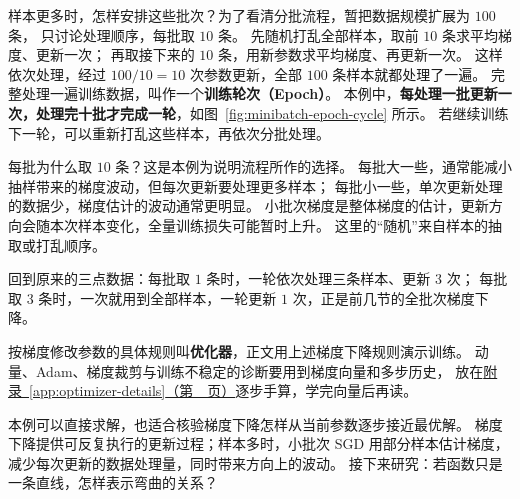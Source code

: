 样本更多时，怎样安排这些批次？为了看清分批流程，暂把数据规模扩展为 $100$ 条，
只讨论处理顺序，每批取 $10$ 条。
先随机打乱全部样本，取前 $10$ 条求平均梯度、更新一次；
再取接下来的 $10$ 条，用新参数求平均梯度、再更新一次。
这样依次处理，经过 $100/10=10$ 次参数更新，全部 $100$ 条样本就都处理了一遍。
\label{concept:epoch}
完整处理一遍训练数据，叫作一个\textbf{训练轮次（Epoch）}。
本例中，\textbf{每处理一批更新一次，处理完十批才完成一轮}，如图~\ref{fig:minibatch-epoch-cycle} 所示。
若继续训练下一轮，可以重新打乱这些样本，再依次分批处理。


每批为什么取 $10$ 条？这是本例为说明流程所作的选择。
每批大一些，通常能减小抽样带来的梯度波动，但每次更新要处理更多样本；
每批小一些，单次更新处理的数据少，梯度估计的波动通常更明显。
小批次梯度是整体梯度的估计，更新方向会随本次样本变化，全量训练损失可能暂时上升。
这里的“随机”来自样本的抽取或打乱顺序。

回到原来的三点数据：每批取 $1$ 条时，一轮依次处理三条样本、更新 $3$ 次；
每批取 $3$ 条时，一次就用到全部样本，一轮更新 $1$ 次，正是前几节的全批次梯度下降。

\label{concept:optimizer}
按梯度修改参数的具体规则叫\textbf{优化器}，正文用上述梯度下降规则演示训练。
动量、Adam、梯度裁剪与训练不稳定的诊断要用到梯度向量和多步历史，
放在\hyperref[app:optimizer-details]{附录~\ref*{app:optimizer-details}（第~\pageref*{app:optimizer-details}~页）}逐步手算，学完向量后再读。\par\medskip



\par\smallskip
本例可以直接求解，也适合核验梯度下降怎样从当前参数逐步接近最优解。
梯度下降提供可反复执行的更新过程；样本多时，小批次 SGD 用部分样本估计梯度，
减少每次更新的数据处理量，同时带来方向上的波动。
接下来研究：若函数只是一条直线，怎样表示弯曲的关系？
